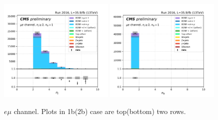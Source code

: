 \begin{figure}[ht]
    \includegraphics[width=0.49\textwidth]{chapters/Appendix/sectionPlots/figures/kinematics_pickles/emu/1b/emu_1b_nJets.pdf}
    \includegraphics[width=0.49\textwidth]{chapters/Appendix/sectionPlots/figures/kinematics_pickles/emu/1b/emu_1b_nBJets.pdf}
    
    \caption{$e\mu$ channel. Plots in 1b(2b) case are top(bottom) two rows.}
\end{figure}

